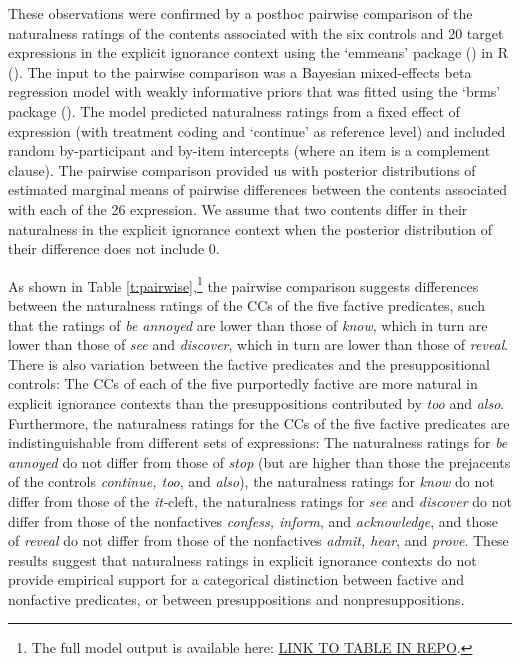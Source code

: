 \documentclass[11pt,fleqn]{article}
\newcommand{\6}{\mbox{$[\hspace*{-.6mm}[$}}
\newcommand{\9}{\mbox{$]\hspace*{-.6mm}]$}}
\begin{document}
These observations were confirmed by a posthoc pairwise comparison of the naturalness ratings of the contents associated with the six controls and 20 target expressions in the explicit ignorance context using the `emmeans' package (\citealt{emmeans}) in R (\citealt{r}). The input to the pairwise comparison was a Bayesian mixed-effects beta regression model with weakly informative priors that was fitted using the `brms' package (\citealt{buerkner2017}). The model predicted naturalness ratings from a fixed effect of expression (with treatment coding and `continue' as reference level) and included random by-participant and by-item intercepts (where an item is a complement clause). The pairwise comparison provided us with posterior distributions of estimated marginal means of pairwise differences between the contents associated with each of the 26 expression. We assume that two contents differ in their naturalness in the explicit ignorance context when the posterior distribution of their difference does not include 0. 

As shown in Table \ref{t:pairwise},\footnote{The full model output is available here: \url{LINK TO TABLE IN REPO}.} the pairwise comparison suggests differences between the naturalness ratings of the CCs of the five factive predicates, such that the ratings of {\em be annoyed} are lower than those of {\em know}, which in turn are lower than those of {\em see} and {\em discover}, which in turn are lower than those of {\em reveal}. There is also variation between the factive predicates and the presuppositional controls: The CCs of each of the five purportedly factive are more natural in explicit ignorance contexts than the presuppositions contributed by {\em too} and {\em also}. Furthermore, the naturalness ratings for the CCs of the five factive predicates are indistinguishable from different sets of expressions: The naturalness ratings for {\em be annoyed} do not differ from those of {\em stop} (but are higher than those the prejacents of the controls {\em continue, too}, and {\em also}), the naturalness ratings for {\em know} do not differ from those of the {\em it-}cleft, the naturalness ratings for {\em see} and {\em discover} do not differ from those of the nonfactives {\em confess, inform}, and {\em acknowledge}, and those of {\em reveal} do not differ from those of the nonfactives {\em admit, hear}, and {\em prove}. These results suggest that naturalness ratings in explicit ignorance contexts do not provide empirical support for a categorical distinction between factive and nonfactive predicates, or between presuppositions and nonpresuppositions.
\end{document}
